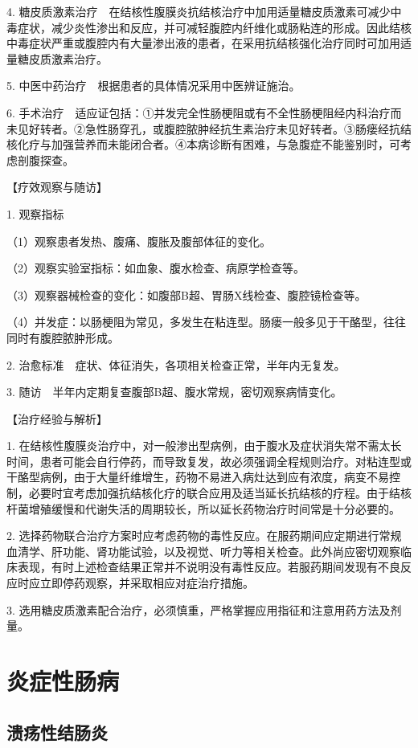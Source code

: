 4.
糖皮质激素治疗　在结核性腹膜炎抗结核治疗中加用适量糖皮质激素可减少中毒症状，减少炎性渗出和反应，并可减轻腹腔内纤维化或肠粘连的形成。因此结核中毒症状严重或腹腔内有大量渗出液的患者，在采用抗结核强化治疗同时可加用适量糖皮质激素治疗。

5. 中医中药治疗　根据患者的具体情况采用中医辨证施治。

6.
手术治疗　适应证包括：①并发完全性肠梗阻或有不全性肠梗阻经内科治疗而未见好转者。②急性肠穿孔，或腹腔脓肿经抗生素治疗未见好转者。③肠瘘经抗结核化疗与加强营养而未能闭合者。④本病诊断有困难，与急腹症不能鉴别时，可考虑剖腹探查。

【疗效观察与随访】

1. 观察指标

（1）观察患者发热、腹痛、腹胀及腹部体征的变化。

（2）观察实验室指标：如血象、腹水检查、病原学检查等。

（3）观察器械检查的变化：如腹部B超、胃肠X线检查、腹腔镜检查等。

（4）并发症：以肠梗阻为常见，多发生在粘连型。肠瘘一般多见于干酪型，往往同时有腹腔脓肿形成。

2. 治愈标准　症状、体征消失，各项相关检查正常，半年内无复发。

3. 随访　半年内定期复查腹部B超、腹水常规，密切观察病情变化。

【治疗经验与解析】

1.
在结核性腹膜炎治疗中，对一般渗出型病例，由于腹水及症状消失常不需太长时间，患者可能会自行停药，而导致复发，故必须强调全程规则治疗。对粘连型或干酪型病例，由于大量纤维增生，药物不易进入病灶达到应有浓度，病变不易控制，必要时宜考虑加强抗结核化疗的联合应用及适当延长抗结核的疗程。由于结核杆菌增殖缓慢和代谢失活的周期较长，所以延长药物治疗时间常是十分必要的。

2.
选择药物联合治疗方案时应考虑药物的毒性反应。在服药期间应定期进行常规血清学、肝功能、肾功能试验，以及视觉、听力等相关检查。此外尚应密切观察临床表现，有时上述检查结果正常并不说明没有毒性反应。若服药期间发现有不良反应时应立即停药观察，并采取相应对症治疗措施。

3.
选用糖皮质激素配合治疗，必须慎重，严格掌握应用指征和注意用药方法及剂量。

\section{炎症性肠病}

\subsection{溃疡性结肠炎}

